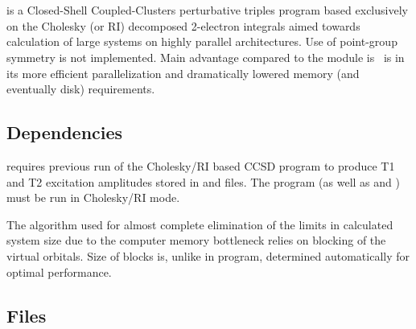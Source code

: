 \section{}
\label{sec:cht3}

 is a Closed-Shell Coupled-Clusters perturbative triples
program based exclusively on the Cholesky (or RI) decomposed 2-electron integrals
aimed towards calculation of large systems on highly parallel architectures. Use of
point-group symmetry is not implemented. Main advantage compared to the
 module is \molcas~is in its more efficient parallelization and
dramatically lowered memory (and eventually disk) requirements. %

\subsection{Dependencies}
\label{sec:cht3_dependencies}

 requires previous run of the  Cholesky/RI
based CCSD program to produce T1 and T2 excitation amplitudes stored in 
and  files.
The  program (as well as  and ) must be run
in Cholesky/RI mode.

The algorithm used for almost complete elimination of the 
limits in calculated system size due to the computer memory bottleneck relies
on blocking of the virtual orbitals. Size of blocks is, unlike in  program, determined automatically for optimal performance.

\subsection{Files}
\label{sec:cht3_files}

